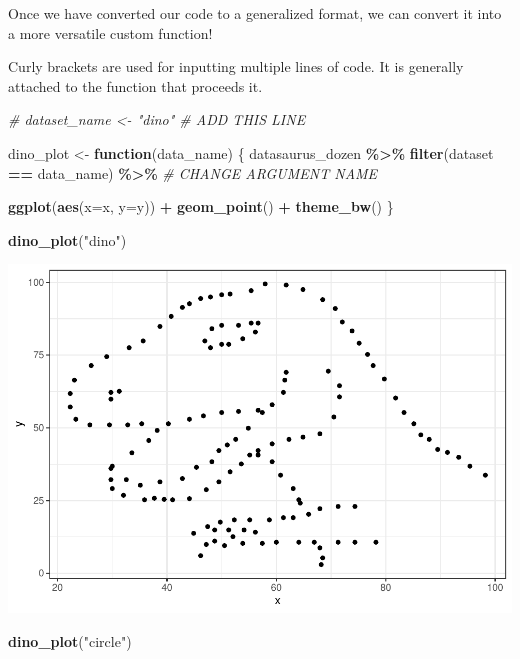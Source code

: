 \documentclass[
]{book}
\newenvironment{Shaded}{\begin{snugshade}}{\end{snugshade}}
\newcommand{\AttributeTok}[1]{\textcolor[rgb]{0.13,0.29,0.53}{#1}}
\newcommand{\CommentTok}[1]{\textcolor[rgb]{0.56,0.35,0.01}{\textit{#1}}}
\newcommand{\ControlFlowTok}[1]{\textcolor[rgb]{0.13,0.29,0.53}{\textbf{#1}}}
\newcommand{\FunctionTok}[1]{\textcolor[rgb]{0.13,0.29,0.53}{\textbf{#1}}}
\newcommand{\NormalTok}[1]{#1}
\newcommand{\OtherTok}[1]{\textcolor[rgb]{0.56,0.35,0.01}{#1}}
\newcommand{\SpecialCharTok}[1]{\textcolor[rgb]{0.81,0.36,0.00}{\textbf{#1}}}
\newcommand{\StringTok}[1]{\textcolor[rgb]{0.31,0.60,0.02}{#1}}
\begin{document}
Once we have converted our code to a generalized format, we can convert it into a more versatile custom function!

Curly brackets are used for inputting multiple lines of code. It is generally attached to the function that proceeds it.

\begin{Shaded}
\begin{Highlighting}[]
\CommentTok{\# dataset\_name \textless{}{-} "dino" \# ADD THIS LINE}

\NormalTok{dino\_plot }\OtherTok{\textless{}{-}} \ControlFlowTok{function}\NormalTok{(data\_name) \{}
\NormalTok{  datasaurus\_dozen }\SpecialCharTok{\%\textgreater{}\%} 
    \FunctionTok{filter}\NormalTok{(dataset }\SpecialCharTok{==}\NormalTok{ data\_name) }\SpecialCharTok{\%\textgreater{}\%} \CommentTok{\# CHANGE ARGUMENT NAME}
    
    \FunctionTok{ggplot}\NormalTok{(}\FunctionTok{aes}\NormalTok{(}\AttributeTok{x=}\NormalTok{x, }\AttributeTok{y=}\NormalTok{y)) }\SpecialCharTok{+} 
    \FunctionTok{geom\_point}\NormalTok{() }\SpecialCharTok{+}
    \FunctionTok{theme\_bw}\NormalTok{()}
\NormalTok{\}}

\FunctionTok{dino\_plot}\NormalTok{(}\StringTok{"dino"}\NormalTok{)}
\end{Highlighting}
\end{Shaded}

\includegraphics{_main_files/figure-latex/unnamed-chunk-72-1.pdf}

\begin{Shaded}
\begin{Highlighting}[]
\FunctionTok{dino\_plot}\NormalTok{(}\StringTok{"circle"}\NormalTok{)}
\end{Highlighting}
\end{Shaded}
\end{document}
